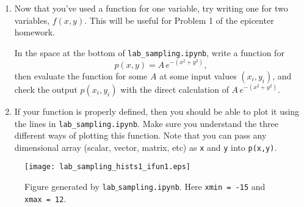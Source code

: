 \documentclass[11pt,titlepage,fleqn]{article}
\begin{document}
\begin{enumerate}
\item Now that you've used a function for one variable, try writing one for two variables, $f(x,y)$. This will be useful for Problem 1 of the epicenter homework.

In the space at the bottom of \verb+lab_sampling.ipynb+, write a function for 
%
\begin{equation*}
p(x,y) = A\,e^{-(x^2+y^2)},
\end{equation*}
%
then evaluate the function for some $A$ at some input values $(x_i,y_i)$, and check the output $p(x_i,y_i)$ with the direct calculation of $A\,e^{-(x^2+y^2)}$.

\item If your function is properly defined, then you should be able to plot it using the lines in \verb+lab_sampling.ipynb+. Make sure you understand the three different ways of plotting this function. Note that you can pass any dimensional array (scalar, vector, matrix, etc) as \verb+x+ and \verb+y+ into \verb+p(x,y)+.

\end{enumerate}


\begin{figure}
\centering
\texttt{[image: lab\_sampling\_hists1\_ifun1.eps]}
\caption[]
{{
Figure generated by {\tt lab$\_$sampling.ipynb}. %
Here {\tt xmin = -15} and {\tt xmax = 12}.
\label{fig}
}}
\end{figure}


\clearpage\pagebreak



\end{document}
